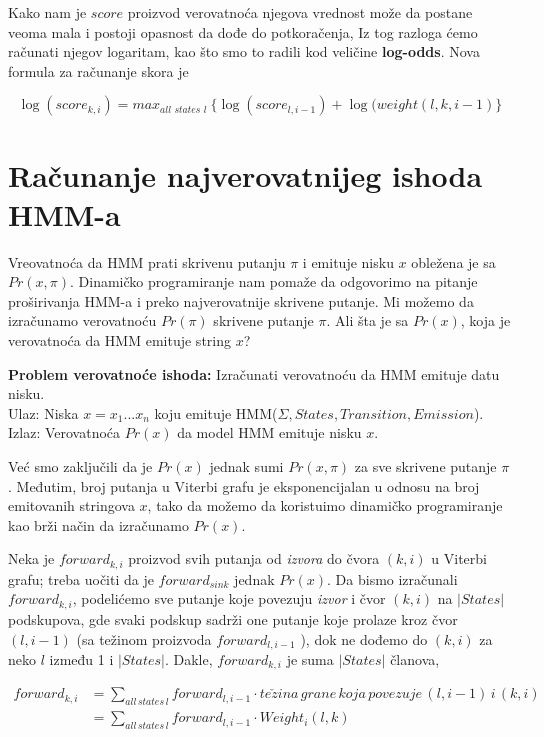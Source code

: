 Kako nam je $score$ proizvod verovatnoća njegova vrednost može da postane veoma mala i postoji opasnost da dođe do potkoračenja, Iz tog razloga ćemo računati njegov logaritam, kao što smo to radili kod veličine \textbf{log-odds}. Nova formula za računanje skora je

$$\log(score_{k, i}) = max_{\textit{all states l }}\{\log(score_{l, i-1}) + \log(weight(l, k, i-1)\}$$


\section{Računanje najverovatnijeg ishoda HMM-a}


Vreovatnoća da HMM prati skrivenu putanju $\pi$ i emituje nisku $x$ obležena je sa $Pr(x, \pi)$. Dinamičko programiranje nam pomaže da odgovorimo na pitanje proširivanja HMM-a i preko najverovatnije skrivene putanje. Mi možemo da izračunamo verovatnoću $ Pr(\pi) $ skrivene putanje $ \pi $. Ali šta je sa $ Pr(x) $, koja je verovatnoća da HMM emituje string $ x $?

\begin{tcolorbox}\textbf{Problem verovatnoće ishoda:}
    Izračunati verovatnoću da HMM emituje datu nisku.\\
    Ulaz: Niska $ x = x_1 . . . x_n $ koju emituje HMM($ \Sigma, States, Transition, Emission $).\\ 
    Izlaz: Verovatnoća $ Pr(x) $ da model HMM emituje nisku $ x $.    
\end{tcolorbox}

Već smo zaključili da je $ Pr(x) $ jednak sumi $ Pr(x, \pi) $ za sve skrivene putanje $ \pi $. Međutim, broj putanja u Viterbi grafu je eksponencijalan u odnosu na broj emitovanih stringova $ x $, tako da možemo da koristuimo dinamičko programiranje kao brži način da izračunamo $ Pr(x) $.

Neka je $ forward_{k, i} $ proizvod svih putanja od \textit{izvora} do čvora $ (k, i) $ u Viterbi grafu; treba uočiti da je $ forward_{sink} $ jednak $ Pr(x) $. Da bismo izračunali $ forward_{k, i} $, podelićemo sve putanje koje povezuju \textit{izvor} i čvor $ (k, i) $ na $ |States| $ podskupova, gde svaki podskup sadrži one putanje koje prolaze kroz čvor $ (l, i-1) $ (sa težinom proizvoda  $ forward_{l, i-1} $ ), dok ne dođemo do $ (k, i) $ za neko $ l $ između 1 i $ |States| $. Dakle, $ forward_{k, i} $ je suma $ |States| $ članova, 

\begin{equation}
\begin{aligned}
    forward_{k, i} & = {\displaystyle \sum_{all\,states\,l} forward_{l, i-1} \cdot te\check{z}ina\,grane\,koja\,povezuje\,(l, i-1)\,i\,(k, i)} \\
    &= {\displaystyle \sum_{all\,states\,l} forward_{l, i-1} \cdot Weight_i(l, k)}
\end{aligned}    
\end{equation}




